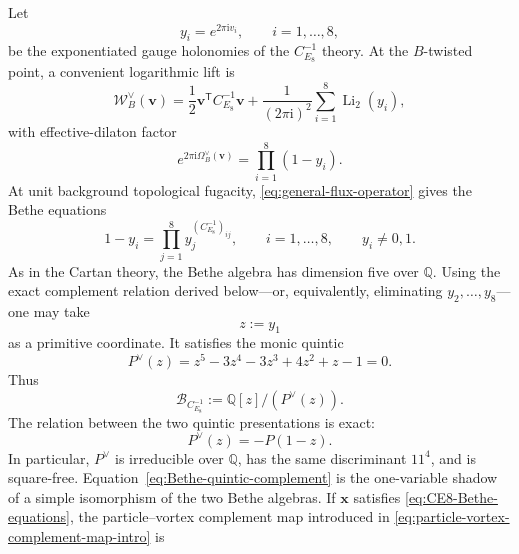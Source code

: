 \documentclass[11pt,a4paper]{article}
\numberwithin{equation}{section}
\begin{document}
Let
\begin{equation}
  y_i=e^{2\pi \mathrm{i} v_i},
  \qquad i=1,\ldots,8,
\end{equation}
be the exponentiated gauge holonomies of the $C_{E_8}^{-1}$ theory.  At the $B$-twisted point, a convenient logarithmic lift is
\begin{equation}
  \mathcal W_B^\vee(\boldsymbol v)
  =\frac12\boldsymbol v^{\mathsf T}C_{E_8}^{-1}\boldsymbol v
  +\frac{1}{(2\pi\mathrm{i})^2}
  \sum_{i=1}^{8}\operatorname{Li}_2(y_i),
  \label{eq:CE8inv-B-twisted-superpotential}
\end{equation}
with effective-dilaton factor
\begin{equation}
  e^{2\pi\mathrm{i}\Omega_B^\vee(\boldsymbol v)}
  =\prod_{i=1}^{8}(1-y_i).
  \label{eq:CE8inv-B-effective-dilaton}
\end{equation}
At unit background topological fugacity, \eqref{eq:general-flux-operator} gives the Bethe equations
\begin{equation}
  1-y_i
  =\prod_{j=1}^{8}y_j^{(C_{E_8}^{-1})_{ij}},
  \qquad
  i=1,\ldots,8,
  \qquad
  y_i\neq0,1.
  \label{eq:CE8inv-Bethe-equations}
\end{equation}
As in the Cartan theory, the Bethe algebra has dimension five over $\mathbb Q$.  Using the exact complement relation derived below---or, equivalently, eliminating $y_2,\ldots,y_8$---one may take
\begin{equation}
  z:=y_1
\end{equation}
as a primitive coordinate.  It satisfies the monic quintic
\begin{equation}
  P^\vee(z)
  =z^5-3z^4-3z^3+4z^2+z-1=0.
  \label{eq:CE8inv-Bethe-quintic}
\end{equation}
Thus
\begin{equation}
  \mathcal B_{C_{E_8}^{-1}}
  :=
  \mathbb Q[z]/(P^\vee(z)).
  \label{eq:CE8inv-Bethe-algebra}
\end{equation}
The relation between the two quintic presentations is exact:
\begin{equation}
  P^\vee(z)=-P(1-z).
  \label{eq:Bethe-quintic-complement}
\end{equation}
In particular, $P^\vee$ is irreducible over $\mathbb Q$, has the same discriminant $11^4$, and is square-free.  Equation~\eqref{eq:Bethe-quintic-complement} is the one-variable shadow of a simple isomorphism of the two Bethe algebras.  If $\boldsymbol x$ satisfies \eqref{eq:CE8-Bethe-equations}, the particle--vortex complement map introduced in \eqref{eq:particle-vortex-complement-map-intro} is
\end{document}
